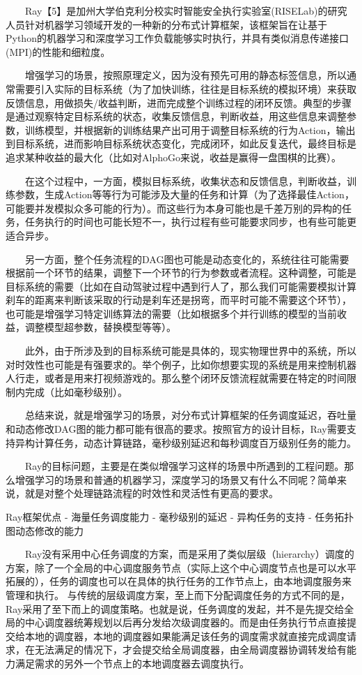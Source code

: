   Ray【5】是加州大学伯克利分校实时智能安全执行实验室(RISELab)的研究人员针对机器学习领域开发的一种新的分布式计算框架，该框架旨在让基于Python的机器学习和深度学习工作负载能够实时执行，并具有类似消息传递接口(MPI)的性能和细粒度。

  增强学习的场景，按照原理定义，因为没有预先可用的静态标签信息，所以通常需要引入实际的目标系统（为了加快训练，往往是目标系统的模拟环境）来获取反馈信息，用做损失/收益判断，进而完成整个训练过程的闭环反馈。典型的步骤是通过观察特定目标系统的状态，收集反馈信息，判断收益，用这些信息来调整参数，训练模型，并根据新的训练结果产出可用于调整目标系统的行为Action，输出到目标系统，进而影响目标系统状态变化，完成闭环，如此反复迭代，最终目标是追求某种收益的最大化（比如对AlphoGo来说，收益是赢得一盘围棋的比赛）。

  在这个过程中，一方面，模拟目标系统，收集状态和反馈信息，判断收益，训练参数，生成Action等等行为可能涉及大量的任务和计算（为了选择最佳Action，可能要并发模拟众多可能的行为）。而这些行为本身可能也是千差万别的异构的任务，任务执行的时间也可能长短不一，执行过程有些可能要求同步，也有些可能更适合异步。

  另一方面，整个任务流程的DAG图也可能是动态变化的，系统往往可能需要根据前一个环节的结果，调整下一个环节的行为参数或者流程。这种调整，可能是目标系统的需要（比如在自动驾驶过程中遇到行人了，那么我们可能需要模拟计算刹车的距离来判断该采取的行动是刹车还是拐弯，而平时可能不需要这个环节），也可能是增强学习特定训练算法的需要（比如根据多个并行训练的模型的当前收益，调整模型超参数，替换模型等等）。

  此外，由于所涉及到的目标系统可能是具体的，现实物理世界中的系统，所以对时效性也可能是有强要求的。举个例子，比如你想要实现的系统是用来控制机器人行走，或者是用来打视频游戏的。那么整个闭环反馈流程就需要在特定的时间限制内完成（比如毫秒级别）。

  总结来说，就是增强学习的场景，对分布式计算框架的任务调度延迟，吞吐量和动态修改DAG图的能力都可能有很高的要求。按照官方的设计目标，Ray需要支持异构计算任务，动态计算链路，毫秒级别延迟和每秒调度百万级别任务的能力。

  Ray的目标问题，主要是在类似增强学习这样的场景中所遇到的工程问题。那么增强学习的场景和普通的机器学习，深度学习的场景又有什么不同呢？简单来说，就是对整个处理链路流程的时效性和灵活性有更高的要求。

Ray框架优点 - 海量任务调度能力 - 毫秒级别的延迟 - 异构任务的支持 -
任务拓扑图动态修改的能力

  Ray没有采用中心任务调度的方案，而是采用了类似层级（hierarchy）调度的方案，除了一个全局的中心调度服务节点（实际上这个中心调度节点也是可以水平拓展的），任务的调度也可以在具体的执行任务的工作节点上，由本地调度服务来管理和执行。
与传统的层级调度方案，至上而下分配调度任务的方式不同的是，Ray采用了至下而上的调度策略。也就是说，任务调度的发起，并不是先提交给全局的中心调度器统筹规划以后再分发给次级调度器的。而是由任务执行节点直接提交给本地的调度器，本地的调度器如果能满足该任务的调度需求就直接完成调度请求，在无法满足的情况下，才会提交给全局调度器，由全局调度器协调转发给有能力满足需求的另外一个节点上的本地调度器去调度执行。

